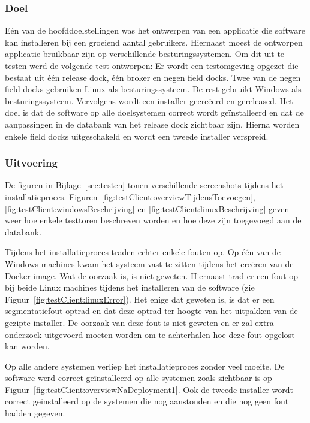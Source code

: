 \subsubsection{Doel}
Eén van de hoofddoelstellingen was het ontwerpen van een applicatie die software kan installeren bij een groeiend aantal gebruikers.
Hiernaast moest de ontworpen applicatie bruikbaar zijn op verschillende besturingssystemen.
Om dit uit te testen werd de volgende test ontworpen:
Er wordt een testomgeving opgezet die bestaat uit één release dock, één broker en negen field docks.
Twee van de negen field docks gebruiken Linux als besturingssysteem.
De rest gebruikt Windows als besturingssysteem.
Vervolgens wordt een installer gecreëerd en gereleased.
Het doel is dat de software op alle doelsystemen correct wordt geïnstalleerd en dat de aanpassingen in de databank van het release dock zichtbaar zijn.
Hierna worden enkele field docks uitgeschakeld en wordt een tweede installer verspreid.

\subsubsection{Uitvoering}
De figuren in Bijlage~\ref{sec:testen} tonen verschillende screenshots tijdens het installatieproces.
Figuren~\ref{fig:testClient:overviewTijdensToevoegen}, \ref{fig:testClient:windowsBeschrijving} en \ref{fig:testClient:linuxBeschrijving} geven weer hoe enkele testtoren beschreven worden en hoe deze zijn toegevoegd aan de databank.

Tijdens het installatieproces traden echter enkele fouten op.
Op één van de Windows machines kwam het systeem vast te zitten tijdens het creëren van de Docker image.
Wat de oorzaak is, is niet geweten.
Hiernaast trad er een fout op bij beide Linux machines tijdens het installeren van de software (zie Figuur~\ref{fig:testClient:linuxError}).
Het enige dat geweten is, is dat er een segmentatiefout optrad en dat deze optrad ter hoogte van het uitpakken van de gezipte installer.
De oorzaak van deze fout is niet geweten en er zal extra onderzoek uitgevoerd moeten worden om te achterhalen hoe deze fout opgelost kan worden.

Op alle andere systemen verliep het installatieproces zonder veel moeite.
De software werd correct geïnstalleerd op alle systemen zoals zichtbaar is op Figuur~\ref{fig:testClient:overviewNaDeployment1}.
Ook de tweede installer wordt correct geïnstalleerd op de systemen die nog aanstonden en die nog geen fout hadden gegeven.

